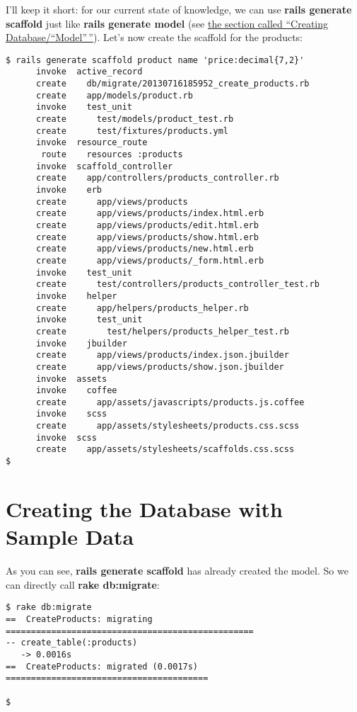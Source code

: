 \documentclass[a4paper]{book}
\newcounter{tab}[chapter]
\begin{document}
I'll keep it short: for our current state of knowledge, we can use \textbf{rails generate scaffold} just like \textbf{rails generate model} (see \hyperref[activerecordux5fdatenbankux5fanlegen]{the section called “Creating Database/``Model”\,''}). Let's now create the scaffold for the products:

\begin{shaded}\begin{verbatim}
$ rails generate scaffold product name 'price:decimal{7,2}'
      invoke  active_record
      create    db/migrate/20130716185952_create_products.rb
      create    app/models/product.rb
      invoke    test_unit
      create      test/models/product_test.rb
      create      test/fixtures/products.yml
      invoke  resource_route
       route    resources :products
      invoke  scaffold_controller
      create    app/controllers/products_controller.rb
      invoke    erb
      create      app/views/products
      create      app/views/products/index.html.erb
      create      app/views/products/edit.html.erb
      create      app/views/products/show.html.erb
      create      app/views/products/new.html.erb
      create      app/views/products/_form.html.erb
      invoke    test_unit
      create      test/controllers/products_controller_test.rb
      invoke    helper
      create      app/helpers/products_helper.rb
      invoke      test_unit
      create        test/helpers/products_helper_test.rb
      invoke    jbuilder
      create      app/views/products/index.json.jbuilder
      create      app/views/products/show.json.jbuilder
      invoke  assets
      invoke    coffee
      create      app/assets/javascripts/products.js.coffee
      invoke    scss
      create      app/assets/stylesheets/products.css.scss
      invoke  scss
      create    app/assets/stylesheets/scaffolds.css.scss
$
\end{verbatim}\end{shaded}

\section{Creating the Database with Sample Data}\label{creating-the-database-with-sample-data}

As you can see, \textbf{rails generate scaffold} has already created the model. So we can directly call \textbf{rake db:migrate}:

\begin{shaded}\begin{verbatim}
$ rake db:migrate
==  CreateProducts: migrating =================================================
-- create_table(:products)
   -> 0.0016s
==  CreateProducts: migrated (0.0017s) ========================================

$
\end{verbatim}\end{shaded}
\end{document}
